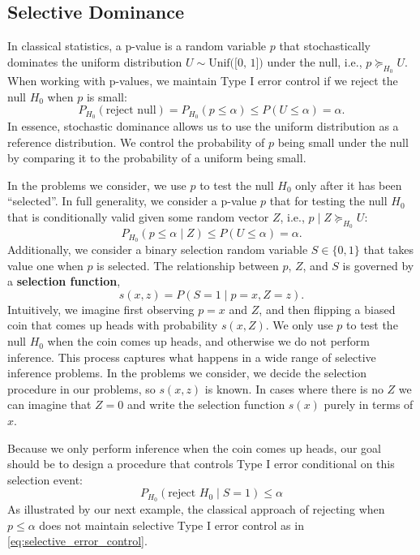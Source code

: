 \documentclass{article}
\begin{document}
\subsection{Selective Dominance}

In classical statistics, a p-value is a random variable $p$ that stochastically dominates the uniform distribution $U \sim \text{Unif([0, 1])}$ under the null, i.e., $p \succeq_{H_0} U$. When working with p-values, we maintain Type I error control if we reject the null $H_0$ when $p$ is small:
\begin{equation*}
    P_{H_0}(\text{reject null}) = P_{H_0}(p \leq \alpha) \leq P(U \leq \alpha)  = \alpha.
\end{equation*}
In essence, stochastic dominance allows us to use the uniform distribution as a reference distribution. We control the probability of $p$ being small under the null by comparing it to the probability of a uniform being small. 

In the problems we consider, we use $p$ to test the null $H_0$ only after it has been ``selected''. In full generality, we consider a p-value $p$ that for testing the null $H_0$ that is conditionally valid given some random vector $Z$, i.e., $p \mid Z \succeq_{H_0} U$:
\begin{equation}
    \label{eq:valid_given_z}
    P_{H_0}(p \leq \alpha \mid Z) \leq P(U \leq \alpha)  = \alpha.
\end{equation}
Additionally, we consider a binary selection random variable $S \in \{0, 1\}$ that takes value one when $p$ is selected. The relationship between $p$, $Z$, and $S$ is governed by a \textbf{selection function},
\begin{equation*}
    s(x, z) = P(S = 1 \mid p = x, Z = z).
\end{equation*}
Intuitively, we imagine first observing $p=x$ and $Z$, and then flipping a biased coin that comes up heads with probability $s(x, Z)$. We only use $p$ to test the null $H_0$ when the coin comes up heads, and otherwise we do not perform inference. This process captures what happens in a wide range of selective inference problems. In the problems we consider, we decide the selection procedure in our problems, so $s(x, z)$ is known. In cases where there is no $Z$ we can imagine that $Z=0$ and write the selection function $s(x)$ purely in terms of $x$. 

Because we only perform inference when the coin comes up heads, our goal should be to design a procedure that controls Type I error conditional on this selection event:
\begin{equation}
    \label{eq:selective_error_control}
    P_{H_0}(\text{reject } H_0 \mid S = 1) \leq \alpha 
\end{equation}
As illustrated by our next example, the classical approach of rejecting when $p \leq \alpha$ does not maintain selective Type I error control as in \eqref{eq:selective_error_control}. 
\end{document}
